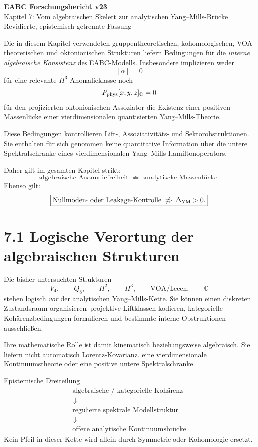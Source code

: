 \documentclass[11pt,a4paper]{article}
\begin{document}
\begin{center}
{\Large\bfseries EABC Forschungsbericht v23}\\[2mm]
{\large Kapitel 7: Vom algebraischen Skelett zur analytischen Yang--Mills-Brücke}\\[1mm]
{\small Revidierte, epistemisch getrennte Fassung}
\end{center}

\begin{warningbox}
Die in diesem Kapitel verwendeten gruppentheoretischen, kohomologischen,
VOA-theoretischen und oktonionischen Strukturen liefern Bedingungen für die
\emph{interne algebraische Konsistenz} des EABC-Modells. Insbesondere implizieren weder
\[
[\alpha]=0
\]
für eine relevante $H^3$-Anomalieklasse noch
\[
P_{\rm phys}[x,y,z]_{\mathbb O}=0
\]
für den projizierten oktonionischen Assoziator die Existenz einer positiven
Massenlücke einer vierdimensionalen quantisierten Yang--Mills-Theorie.

Diese Bedingungen kontrollieren Lift-, Assoziativitäts- und Sektorobstruktionen.
Sie enthalten für sich genommen keine quantitative Information über die untere
Spektralschranke eines vierdimensionalen Yang--Mills-Hamiltonoperators.

Daher gilt im gesamten Kapitel strikt:
\[
\boxed{
\text{algebraische Anomaliefreiheit}
\;\not\Rightarrow\;
\text{analytische Massenlücke}.
}
\]
Ebenso gilt:
\[
\boxed{
\text{Nullmoden- oder Leakage-Kontrolle}
\;\not\Rightarrow\;
\Delta_{\rm YM}>0.
}
\]
\end{warningbox}

\section*{7.1 Logische Verortung der algebraischen Strukturen}

Die bisher untersuchten Strukturen
\[
V_4,\qquad Q_8,\qquad H^2,\qquad H^3,\qquad
\text{VOA/Leech},\qquad \mathbb O
\]
stehen logisch \emph{vor} der analytischen Yang--Mills-Kette. Sie können einen
diskreten Zustandsraum organisieren, projektive Liftklassen kodieren,
kategorielle Kohärenzbedingungen formulieren und bestimmte interne
Obstruktionen ausschließen.

Ihre mathematische Rolle ist damit kinematisch beziehungsweise algebraisch.
Sie liefern nicht automatisch Lorentz-Kovarianz, eine vierdimensionale
Kontinuumstheorie oder eine positive untere Spektralschranke.

\begin{statusbox}{Epistemische Dreiteilung}
\[
\boxed{
\begin{array}{c}
\text{algebraische / kategorielle Kohärenz}\\
\Downarrow\\
\text{regulierte spektrale Modellstruktur}\\
\Downarrow\\
\text{offene analytische Kontinuumsbrücke}
\end{array}}
\]
Kein Pfeil in dieser Kette wird allein durch Symmetrie oder Kohomologie ersetzt.
\end{statusbox}
\end{document}

